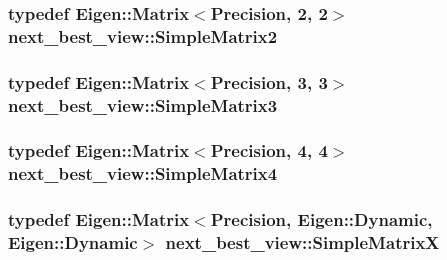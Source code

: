 \hypertarget{namespacenext__best__view_ac133d93bd53e4270c384bed16adbcdda}{
\subsubsection[{\-Simple\-Matrix2}]{\setlength{\rightskip}{0pt plus 5cm}typedef \-Eigen\-::\-Matrix$<${\bf \-Precision}, 2, 2$>$ {\bf next\-\_\-best\-\_\-view\-::\-Simple\-Matrix2}}}\label{namespacenext__best__view_ac133d93bd53e4270c384bed16adbcdda}
\hypertarget{namespacenext__best__view_ac6b088f069768b63919889e90588aa69}{
\subsubsection[{\-Simple\-Matrix3}]{\setlength{\rightskip}{0pt plus 5cm}typedef \-Eigen\-::\-Matrix$<${\bf \-Precision}, 3, 3$>$ {\bf next\-\_\-best\-\_\-view\-::\-Simple\-Matrix3}}}\label{namespacenext__best__view_ac6b088f069768b63919889e90588aa69}
\hypertarget{namespacenext__best__view_a77d41215b9a830f85cdf8e2ad175e9c2}{
\subsubsection[{\-Simple\-Matrix4}]{\setlength{\rightskip}{0pt plus 5cm}typedef \-Eigen\-::\-Matrix$<${\bf \-Precision}, 4, 4$>$ {\bf next\-\_\-best\-\_\-view\-::\-Simple\-Matrix4}}}\label{namespacenext__best__view_a77d41215b9a830f85cdf8e2ad175e9c2}
\hypertarget{namespacenext__best__view_a547bea8e33e3c78bfa2f6ad90da0c04e}{
\subsubsection[{\-Simple\-Matrix\-X}]{\setlength{\rightskip}{0pt plus 5cm}typedef \-Eigen\-::\-Matrix$<${\bf \-Precision}, \-Eigen\-::\-Dynamic, \-Eigen\-::\-Dynamic$>$ {\bf next\-\_\-best\-\_\-view\-::\-Simple\-Matrix\-X}}}\label{namespacenext__best__view_a547bea8e33e3c78bfa2f6ad90da0c04e}
